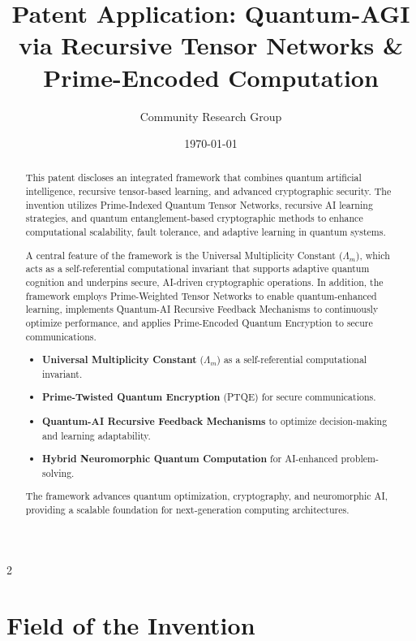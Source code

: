 \documentclass{article}
\title{Patent Application: Quantum-AGI via Recursive Tensor Networks \& Prime-Encoded Computation}
\author{Community Research Group}
\affil{Citizen Gardens - The Foundation of Multiplicity}
\date{\today}
\theoremstyle{plain}
\begin{document}
\maketitle
\nolinenumbers
\begin{abstract}
This patent discloses an integrated framework that combines quantum artificial intelligence, recursive tensor-based learning, and advanced cryptographic security. The invention utilizes Prime-Indexed Quantum Tensor Networks, recursive AI learning strategies, and quantum entanglement-based cryptographic methods to enhance computational scalability, fault tolerance, and adaptive learning in quantum systems.

A central feature of the framework is the Universal Multiplicity Constant ($\Lambda_m$), which acts as a self-referential computational invariant that supports adaptive quantum cognition and underpins secure, AI-driven cryptographic operations. In addition, the framework employs Prime-Weighted Tensor Networks to enable quantum-enhanced learning, implements Quantum-AI Recursive Feedback Mechanisms to continuously optimize performance, and applies Prime-Encoded Quantum Encryption to secure communications.
\begin{itemize}
    \item \textbf{Universal Multiplicity Constant} ($\Lambda_m$) as a self-referential computational invariant.
    \item \textbf{Prime-Twisted Quantum Encryption} (PTQE) for secure communications.
    \item \textbf{Quantum-AI Recursive Feedback Mechanisms} to optimize decision-making and learning adaptability.
    \item \textbf{Hybrid Neuromorphic Quantum Computation} for AI-enhanced problem-solving.
\end{itemize}
The framework advances quantum optimization, cryptography, and neuromorphic AI, providing a scalable foundation for next-generation computing architectures.
\end{abstract}

\newpage
 \begin{multicols}{2}
\begin{singlespace}
\tableofcontents
\end{singlespace}
\end{multicols}

\linenumbers
\section{Field of the Invention}
\end{document}
